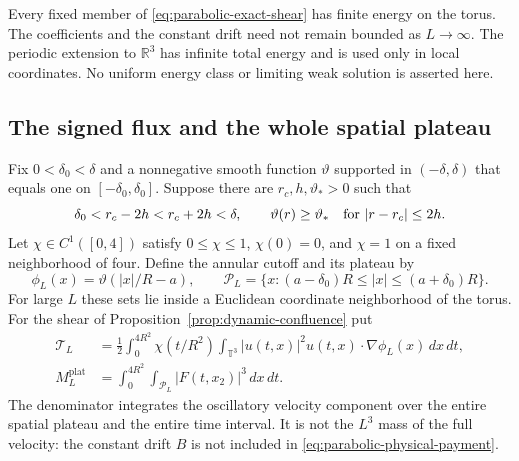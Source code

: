 \begin{remark}
Every fixed member of \eqref{eq:parabolic-exact-shear} has finite energy
on the torus.  The coefficients and the constant drift need not remain
bounded as $L\to\infty$.  The periodic extension to $\mathbb R^3$ has
infinite total energy and is used only in local coordinates.  No uniform
energy class or limiting weak solution is asserted here.
\end{remark}

\subsection{The signed flux and the whole spatial plateau}

Fix $0<\delta_0<\delta$ and a nonnegative smooth function $\vartheta$
supported in $(-\delta,\delta)$ that equals one on
$[-\delta_0,\delta_0]$.  Suppose there are $r_c,h,\vartheta_*>0$ such that
\begin{equation}\label{eq:parabolic-outer-cap}
 \delta_0<r_c-2h<r_c+2h<\delta,
 \qquad \vartheta(r)\ge\vartheta_*
 \quad\hbox{for }|r-r_c|\le2h.
\end{equation}
Let $\chi\in C^1([0,4])$ satisfy $0\le\chi\le1$, $\chi(0)=0$, and $\chi=1$ on a
fixed neighborhood of four.  Define the annular cutoff and its plateau by
\[
 \phi_L(x)=\vartheta(|x|/R-a),\qquad
 \mathcal P_L=\{x:(a-\delta_0)R\le|x|\le(a+\delta_0)R\}.
\]
For large $L$ these sets lie inside a Euclidean coordinate neighborhood
of the torus.  For the shear of Proposition~\ref{prop:dynamic-confluence}
put
\begin{align}
 \mathcal T_L&=\frac12\int_0^{4R^2}\chi(t/R^2)
  \int_{\mathbb T^3}|u(t,x)|^2u(t,x)\cdot\nabla\phi_L(x)\,dx\,dt,
 \label{eq:parabolic-physical-flux}\\
 M_L^{\mathrm{plat}}&=\int_0^{4R^2}\int_{\mathcal P_L}
              |F(t,x_2)|^3\,dx\,dt.
 \label{eq:parabolic-physical-payment}
\end{align}
The denominator integrates the oscillatory velocity component over the
entire spatial plateau and the entire time interval.  It is not the
$L^3$ mass of the full velocity: the constant drift $B$ is not included
in \eqref{eq:parabolic-physical-payment}.

